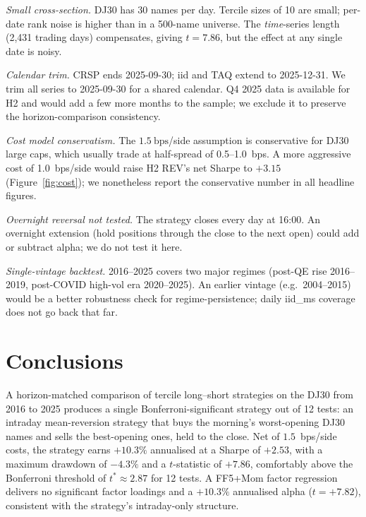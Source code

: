 \documentclass[10pt,conference,compsoc]{IEEEtran}
\begin{document}
\emph{Small cross-section.} DJ30 has 30 names per day. Tercile
sizes of 10 are small; per-date rank noise is higher than in a
500-name universe. The \emph{time}-series length (2{,}431
trading days) compensates, giving $t{=}7.86$, but the effect at
any single date is noisy.

\emph{Calendar trim.} CRSP ends 2025-09-30; iid and TAQ extend
to 2025-12-31. We trim all series to 2025-09-30 for a shared
calendar. Q4 2025 data is available for H2 and would add a few
more months to the sample; we exclude it to preserve the
horizon-comparison consistency.

\emph{Cost model conservatism.} The $1.5~\text{bps}$/side
assumption is conservative for DJ30 large caps, which usually
trade at half-spread of 0.5--1.0~bps. A more aggressive cost
of 1.0~bps/side would raise H2 REV's net Sharpe to $+3.15$
(Figure~\ref{fig:cost}); we nonetheless report the conservative
number in all headline figures.

\emph{Overnight reversal not tested.} The strategy closes every
day at 16:00. An overnight extension (hold positions through
the close to the next open) could add or subtract alpha; we do
not test it here.

\emph{Single-vintage backtest.} 2016--2025 covers two major
regimes (post-QE rise 2016--2019, post-COVID high-vol era
2020--2025). An earlier vintage (e.g.\ 2004--2015) would be a
better robustness check for regime-persistence; daily
iid\_ms coverage does not go back that far.

\section{Conclusions}
\label{sec:conclusions}

A horizon-matched comparison of tercile long--short strategies on
the DJ30 from 2016 to 2025 produces a single Bonferroni-significant
strategy out of 12 tests: an intraday mean-reversion strategy that
buys the morning's worst-opening DJ30 names and sells the
best-opening ones, held to the close. Net of $1.5$~bps/side
costs, the strategy earns $+10.3\%$ annualised at a Sharpe of
$+2.53$, with a maximum drawdown of $-4.3\%$ and a $t$-statistic
of $+7.86$, comfortably above the Bonferroni threshold of
$t^{*}\!\approx 2.87$ for 12 tests. A FF5+Mom factor regression
delivers no significant factor loadings and a $+10.3\%$ annualised
alpha ($t = +7.82$), consistent with the strategy's intraday-only
structure.
\end{document}
